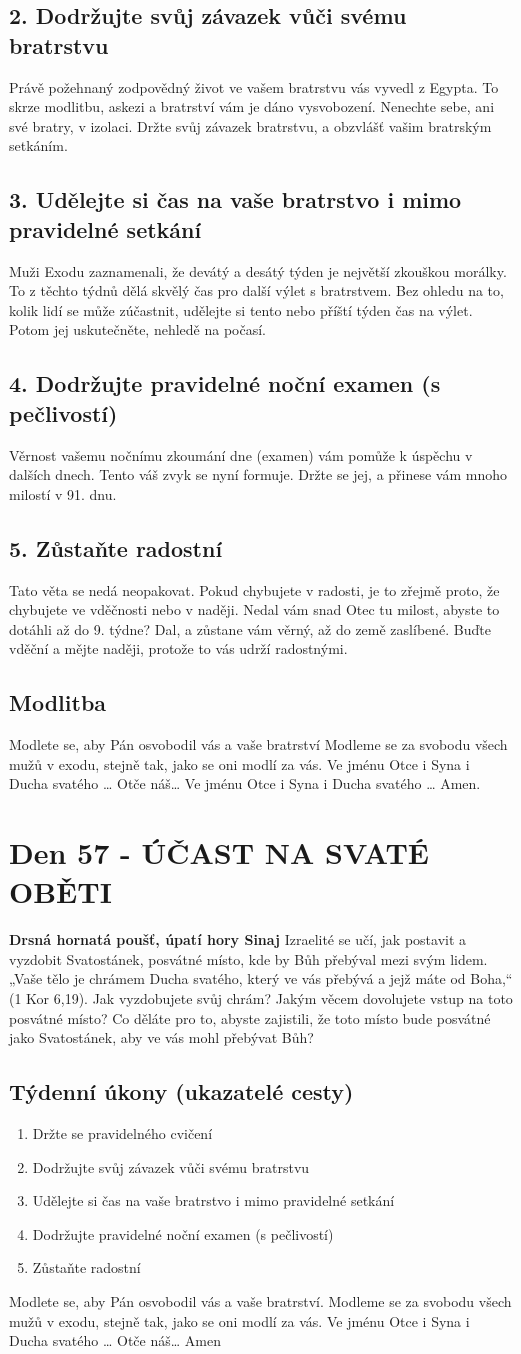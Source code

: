 \documentclass[11pt]{article}
\newcommand{\zacatekDevatyTyden}{
\textbf{Drsná hornatá poušť, úpatí hory Sinaj} \newline 
Izraelité se učí, jak postavit a vyzdobit Svatostánek, posvátné místo, kde by Bůh přebýval mezi svým lidem. „Vaše tělo je chrámem Ducha svatého, který ve vás přebývá a jejž máte od Boha,“ (1 Kor 6,19). Jak vyzdobujete svůj chrám? Jakým věcem dovolujete vstup na toto posvátné místo? Co děláte pro to, abyste zajistili, že toto místo bude posvátné jako Svatostánek, aby ve vás mohl přebývat Bůh?

\subsection*{Týdenní úkony (ukazatelé cesty)}
\begin{enumerate}
  \item Držte se pravidelného cvičení
  \item Dodržujte svůj závazek vůči svému bratrstvu
  \item Udělejte si čas na vaše bratrstvo i mimo pravidelné setkání
  \item Dodržujte pravidelné noční examen (s pečlivostí)
  \item Zůstaňte radostní
\end{enumerate}
Modlete se, aby Pán osvobodil vás a vaše bratrství. \newline
Modleme se za svobodu všech mužů v exodu, stejně tak, jako se oni modlí za vás.\newline
Ve jménu Otce i Syna i Ducha svatého …  Otče náš… Amen
}
\begin{document}
\subsection*{2. Dodržujte svůj závazek vůči svému bratrstvu}
Právě požehnaný zodpovědný život ve vašem bratrstvu vás vyvedl z Egypta. To skrze modlitbu, askezi a bratrství vám je dáno vysvobození. Nenechte sebe, ani své bratry, v izolaci. Držte svůj závazek bratrstvu, a obzvlášť vašim bratrským setkáním.
\subsection*{3. Udělejte si čas na vaše bratrstvo i mimo pravidelné setkání}
Muži Exodu zaznamenali, že devátý a desátý týden je největší zkouškou morálky. To z těchto týdnů dělá skvělý čas pro další výlet s bratrstvem. Bez ohledu na to, kolik lidí se může zúčastnit, udělejte si tento nebo příští týden čas na výlet. Potom jej uskutečněte, nehledě na počasí.
\subsection*{4. Dodržujte pravidelné noční examen (s pečlivostí)}
Věrnost vašemu nočnímu zkoumání dne (examen) vám pomůže k úspěchu v dalších dnech. Tento váš zvyk se nyní formuje. Držte se jej, a přinese vám mnoho milostí v 91. dnu.
\subsection*{5. Zůstaňte radostní}
Tato věta se nedá neopakovat. Pokud chybujete v radosti, je to zřejmě proto, že chybujete ve vděčnosti nebo v naději. Nedal vám snad Otec tu milost, abyste to dotáhli až do 9. týdne? Dal, a zůstane vám věrný, až do země zaslíbené. Buďte vděční a mějte naději, protože to vás udrží radostnými.
\subsection*{Modlitba}
Modlete se, aby Pán osvobodil vás a vaše bratrství \newline
Modleme se za svobodu všech mužů v exodu, stejně tak, jako se oni modlí za vás.\newline
Ve jménu Otce i Syna i Ducha svatého … Otče náš… Ve jménu Otce i Syna i Ducha svatého … Amen.
\newpage


\newpage
\section{Den 57 - ÚČAST NA SVATÉ OBĚTI }
\zacatekDevatyTyden
\end{document}
